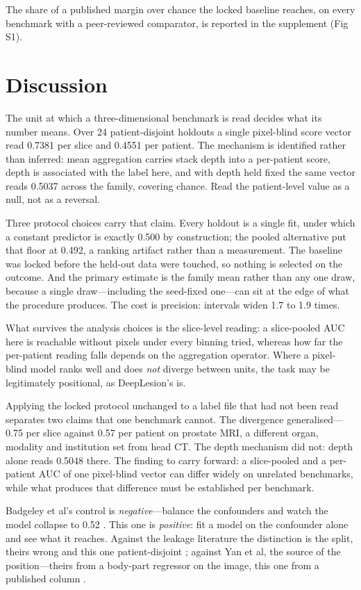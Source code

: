 \documentclass[11pt,letterpaper]{article}
\begin{document}
The share of a published margin over chance the locked baseline reaches, on every
benchmark with a peer-reviewed comparator, is reported in the supplement (Fig S1).

\section*{Discussion}

The unit at which a three-dimensional benchmark is read decides what its number
means. Over 24 patient-disjoint holdouts a single pixel-blind score vector read
0.7381 per slice and 0.4551 per patient. The mechanism is identified rather than inferred: mean aggregation carries
stack depth into a per-patient score, depth is associated with the label here,
and with depth held fixed the same vector reads 0.5037 across the family,
covering chance. Read the patient-level value as a null, not as a reversal.

Three protocol choices carry that claim. Every holdout is a single fit, under
which a constant predictor is exactly 0.500 by construction; the pooled
alternative put that floor at 0.492, a ranking artifact rather than a measurement. The baseline was locked before the held-out data were
touched, so nothing is selected on the outcome. And the primary estimate is the family
mean rather than any one draw, because a single draw---including the seed-fixed
one---can sit at the edge of what the procedure produces. The cost is precision: intervals widen 1.7 to 1.9 times.

What survives the analysis choices is the slice-level reading: a slice-pooled AUC
here is reachable without pixels under every binning tried, whereas how far the
per-patient reading falls depends on the aggregation operator. Where a
pixel-blind model ranks well and does \emph{not} diverge between units, the task
may be legitimately positional, as DeepLesion's is.

Applying the locked protocol unchanged to a label file that had not been read
separates two claims that one benchmark cannot. The divergence generalised---0.75
per slice against 0.57 per patient on prostate MRI, a different organ, modality
and institution set from head CT. The depth mechanism did not: depth alone reads 0.5048 there.
The finding to carry forward: a slice-pooled and a per-patient AUC of one
pixel-blind vector can differ widely on unrelated benchmarks, while what produces
that difference must be established per benchmark.

Badgeley et al's control is \emph{negative}---balance the confounders and watch
the model collapse to 0.52 \citep{badgeley2019hip}. This one is \emph{positive}:
fit a model on the confounder alone and see what it reaches. Against the leakage
literature the distinction is the
split, theirs wrong and this one patient-disjoint
\citep{yagis2021leakage,tampu2022leakage}; against Yan et al, the source of the
position---theirs from a body-part regressor on the image, this one from a
published column \citep{yan2018deeplesiongraphs}.
\end{document}
